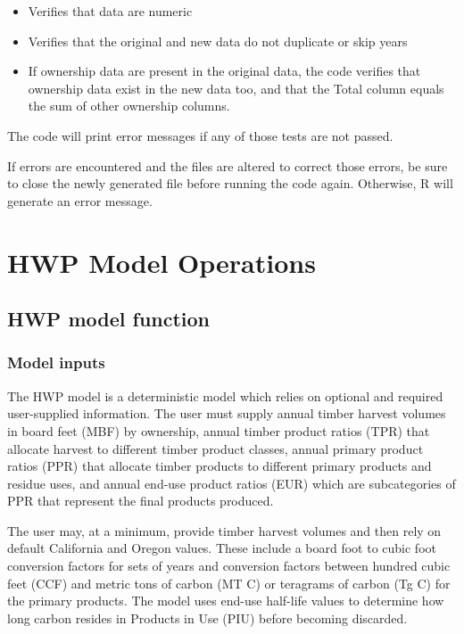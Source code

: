 \documentclass[
  openany]{book}
\begin{document}
\begin{itemize}
\item
  Verifies that data are numeric
\item
  Verifies that the original and new data do not duplicate or skip years
\item
  If ownership data are present in the original data, the code verifies
  that ownership data exist in the new data too, and that the Total
  column equals the sum of other ownership columns.
\end{itemize}

The code will print error messages if any of those tests are not passed.

If errors are encountered and the files are altered to correct those
errors, be sure to close the newly generated file before running the
code again. Otherwise, R will generate an error message.

\hypertarget{model}{%
\chapter{HWP Model Operations}\label{model}}

\hypertarget{model-func}{%
\section{HWP model function}\label{model-func}}

\hypertarget{model-func-inp}{%
\subsection{Model inputs}\label{model-func-inp}}

The HWP model is a deterministic model which relies on optional and
required user-supplied information. The user must supply annual timber
harvest volumes in board feet (MBF) by ownership, annual timber product
ratios (TPR) that allocate harvest to different timber product classes,
annual primary product ratios (PPR) that allocate timber products to
different primary products and residue uses, and annual end-use product
ratios (EUR) which are subcategories of PPR that represent the final
products produced.

The user may, at a minimum, provide timber harvest volumes and then rely
on default California and Oregon values. These include a board foot to
cubic foot conversion factors for sets of years and conversion factors
between hundred cubic feet (CCF) and metric tons of carbon (MT C) or
teragrams of carbon (Tg C) for the primary products. The model uses
end-use half-life values to determine how long carbon resides in
Products in Use (PIU) before becoming discarded.
\end{document}
